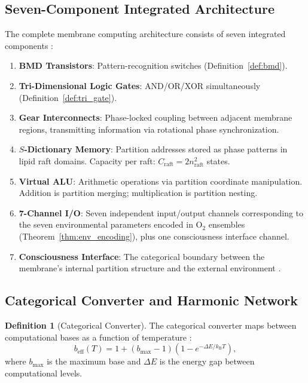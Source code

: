 \documentclass[twocolumn,10pt]{article}
\theoremstyle{definition}
\newtheorem{definition}[theorem]{Definition}
\theoremstyle{remark}
\newcommand{\kB}{k_{\mathrm{B}}}
\newcommand{\beff}{b_{\mathrm{eff}}}
\begin{document}
\subsection{Seven-Component Integrated Architecture}

The complete membrane computing architecture consists of seven integrated components \cite{sachikonye2025circuits, sachikonye2025cpu}:

\begin{enumerate}[label=\arabic*.]
  \item \textbf{BMD Transistors}: Pattern-recognition switches (Definition~\ref{def:bmd}).
  \item \textbf{Tri-Dimensional Logic Gates}: AND/OR/XOR simultaneously (Definition~\ref{def:tri_gate}).
  \item \textbf{Gear Interconnects}: Phase-locked coupling between adjacent membrane regions, transmitting information via rotational phase synchronization.
  \item \textbf{$S$-Dictionary Memory}: Partition addresses stored as phase patterns in lipid raft domains. Capacity per raft: $C_{\mathrm{raft}} = 2n_{\mathrm{raft}}^2$ states.
  \item \textbf{Virtual ALU}: Arithmetic operations via partition coordinate manipulation. Addition is partition merging; multiplication is partition nesting.
  \item \textbf{7-Channel I/O}: Seven independent input/output channels corresponding to the seven environmental parameters encoded in $\mathrm{O}_2$ ensembles (Theorem~\ref{thm:env_encoding}), plus one consciousness interface channel.
  \item \textbf{Consciousness Interface}: The categorical boundary between the membrane's internal partition structure and the external environment \cite{sachikonye2026buhera}.
\end{enumerate}

\subsection{Categorical Converter and Harmonic Network}

\begin{definition}[Categorical Converter]
\label{def:converter}
The categorical converter maps between computational bases as a function of temperature \cite{sachikonye2026converter}:
\begin{equation}
  \beff(T) = 1 + (b_{\max} - 1)\left(1 - e^{-\Delta E / \kB T}\right),
  \label{eq:beff}
\end{equation}
where $b_{\max}$ is the maximum base and $\Delta E$ is the energy gap between computational levels.
\end{definition}
\end{document}
